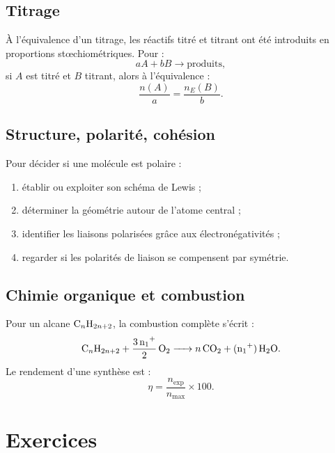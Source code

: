 \documentclass[11pt,a4paper]{article}
\begin{document}
\subsection{Titrage}

\begin{retenirbox}
À l'équivalence d'un titrage, les réactifs titré et titrant ont été introduits en proportions stœchiométriques. Pour :
\[
aA+bB\longrightarrow \text{produits},
\]
si $A$ est titré et $B$ titrant, alors à l'équivalence :
\[
\frac{n(A)}{a}=\frac{n_E(B)}{b}.
\]
\end{retenirbox}

\subsection{Structure, polarité, cohésion}

\begin{methodbox}
Pour décider si une molécule est polaire :
\begin{enumerate}
  \item établir ou exploiter son schéma de Lewis ;
  \item déterminer la géométrie autour de l'atome central ;
  \item identifier les liaisons polarisées grâce aux électronégativités ;
  \item regarder si les polarités de liaison se compensent par symétrie.
\end{enumerate}
\end{methodbox}

\subsection{Chimie organique et combustion}

\begin{retenirbox}
Pour un alcane $\ce{C_nH_{2n+2}}$, la combustion complète s'écrit :
\[
\ce{C_nH_{2n+2} + \frac{3n+1}{2} O2 -> n CO2 + (n+1) H2O}.
\]
Le rendement d'une synthèse est :
\[
\eta=\frac{n_{\text{exp}}}{n_{\text{max}}}\times 100.
\]
\end{retenirbox}

\newpage

\section{Exercices}

\end{document}
